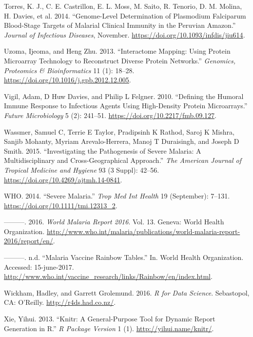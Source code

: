 \documentclass[
  a4paper]{article}
\begin{document}
\leavevmode\hypertarget{ref-Torres2014asymptomatic}{}%
Torres, K. J., C. E. Castrillon, E. L. Moss, M. Saito, R. Tenorio, D. M.
Molina, H. Davies, et al. 2014. ``Genome-Level Determination of
Plasmodium Falciparum Blood-Stage Targets of Malarial Clinical Immunity
in the Peruvian Amazon.'' \emph{Journal of Infectious Diseases},
November. \url{https://doi.org/10.1093/infdis/jiu614}.

\leavevmode\hypertarget{ref-uzoma2013interactome}{}%
Uzoma, Ijeoma, and Heng Zhu. 2013. ``Interactome Mapping: Using Protein
Microarray Technology to Reconstruct Diverse Protein Networks.''
\emph{Genomics, Proteomics \& Bioinformatics} 11 (1): 18--28.
\url{https://doi.org/10.1016/j.gpb.2012.12.005}.

\leavevmode\hypertarget{ref-vigil2010}{}%
Vigil, Adam, D Huw Davies, and Philip L Felgner. 2010. ``Defining the
Humoral Immune Response to Infectious Agents Using High-Density Protein
Microarrays.'' \emph{Future Microbiology} 5 (2): 241--51.
\url{https://doi.org/10.2217/fmb.09.127}.

\leavevmode\hypertarget{ref-wassmer2015}{}%
Wassmer, Samuel C, Terrie E Taylor, Pradipsinh K Rathod, Saroj K Mishra,
Sanjib Mohanty, Myriam Arevalo-Herrera, Manoj T Duraisingh, and Joseph D
Smith. 2015. ``Investigating the Pathogenesis of Severe Malaria: A
Multidisciplinary and Cross-Geographical Approach.'' \emph{The American
Journal of Tropical Medicine and Hygiene} 93 (3 Suppl): 42--56.
\url{https://doi.org/10.4269/ajtmh.14-0841}.

\leavevmode\hypertarget{ref-WHO2014severe}{}%
WHO. 2014. ``Severe Malaria.'' \emph{Trop Med Int Health} 19
(September): 7--131. \url{https://doi.org/10.1111/tmi.12313_2}.

\leavevmode\hypertarget{ref-WHO2016world}{}%
---------. 2016. \emph{World Malaria Report 2016}. Vol. 13. Geneva:
World Health Organization.
\url{http://www.who.int/malaria/publications/world-malaria-report-2016/report/en/}.

\leavevmode\hypertarget{ref-rainbow2016}{}%
---------. n.d. ``Malaria Vaccine Rainbow Tables.'' In. World Health
Organization. Accessed: 15-june-2017.
\url{http://www.who.int/vaccine_research/links/Rainbow/en/index.html}.

\leavevmode\hypertarget{ref-wickham2016r4ds}{}%
Wickham, Hadley, and Garrett Grolemund. 2016. \emph{R for Data Science}.
Sebastopol, CA: O'Reilly. \url{http://r4ds.had.co.nz/}.

\leavevmode\hypertarget{ref-knitr}{}%
Xie, Yihui. 2013. ``Knitr: A General-Purpose Tool for Dynamic Report
Generation in R.'' \emph{R Package Version} 1 (1).
\url{http://yihui.name/knitr/}.
\end{document}
